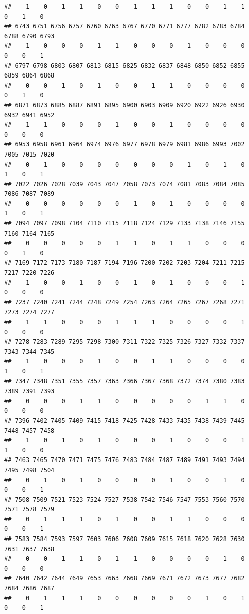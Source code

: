 \documentclass[
]{article}
\begin{document}
\begin{verbatim}
##    1    0    1    1    0    0    1    1    1    0    0    1    1    0    1    0 
## 6743 6751 6756 6757 6760 6763 6767 6770 6771 6777 6782 6783 6784 6788 6790 6793 
##    1    0    0    0    1    1    0    0    0    1    0    0    0    0    0    1 
## 6797 6798 6803 6807 6813 6815 6825 6832 6837 6848 6850 6852 6855 6859 6864 6868 
##    0    0    1    0    1    0    0    1    1    0    0    0    0    0    1    0 
## 6871 6873 6885 6887 6891 6895 6900 6903 6909 6920 6922 6926 6930 6932 6941 6952 
##    1    1    0    0    0    1    0    0    1    0    0    0    0    0    0    0 
## 6953 6958 6961 6964 6974 6976 6977 6978 6979 6981 6986 6993 7002 7005 7015 7020 
##    0    1    0    0    0    0    0    0    0    1    0    1    0    1    0    1 
## 7022 7026 7028 7039 7043 7047 7058 7073 7074 7081 7083 7084 7085 7086 7087 7089 
##    0    0    0    0    0    0    1    0    1    0    0    0    0    1    0    1 
## 7094 7097 7098 7104 7110 7115 7118 7124 7129 7133 7138 7146 7155 7160 7164 7165 
##    0    0    0    0    0    1    1    0    1    1    0    0    0    0    1    0 
## 7169 7172 7173 7180 7187 7194 7196 7200 7202 7203 7204 7211 7215 7217 7220 7226 
##    1    0    0    1    0    0    1    0    1    0    0    0    1    0    0    0 
## 7237 7240 7241 7244 7248 7249 7254 7263 7264 7265 7267 7268 7271 7273 7274 7277 
##    1    1    0    0    0    1    1    1    0    0    0    0    1    0    0    0 
## 7278 7283 7289 7295 7298 7300 7311 7322 7325 7326 7327 7332 7337 7343 7344 7345 
##    1    0    0    0    1    0    0    1    1    0    0    0    0    1    0    1 
## 7347 7348 7351 7355 7357 7363 7366 7367 7368 7372 7374 7380 7383 7389 7391 7393 
##    0    0    0    1    1    0    0    0    0    0    1    1    0    0    0    0 
## 7396 7402 7405 7409 7415 7418 7425 7428 7433 7435 7438 7439 7445 7448 7457 7458 
##    1    0    1    0    1    0    0    0    1    0    0    0    1    1    0    0 
## 7463 7465 7470 7471 7475 7476 7483 7484 7487 7489 7491 7493 7494 7495 7498 7504 
##    0    1    0    1    0    0    0    0    1    0    0    1    0    0    0    1 
## 7508 7509 7521 7523 7524 7527 7538 7542 7546 7547 7553 7560 7570 7571 7578 7579 
##    0    1    1    1    0    1    0    0    1    1    0    0    0    0    0    1 
## 7583 7584 7593 7597 7603 7606 7608 7609 7615 7618 7620 7628 7630 7631 7637 7638 
##    0    0    1    1    0    1    1    0    0    0    0    1    0    0    0    0 
## 7640 7642 7644 7649 7653 7663 7668 7669 7671 7672 7673 7677 7682 7684 7686 7687 
##    0    1    1    1    0    0    0    0    0    0    1    0    1    0    0    1 

\end{verbatim}
\end{document}

